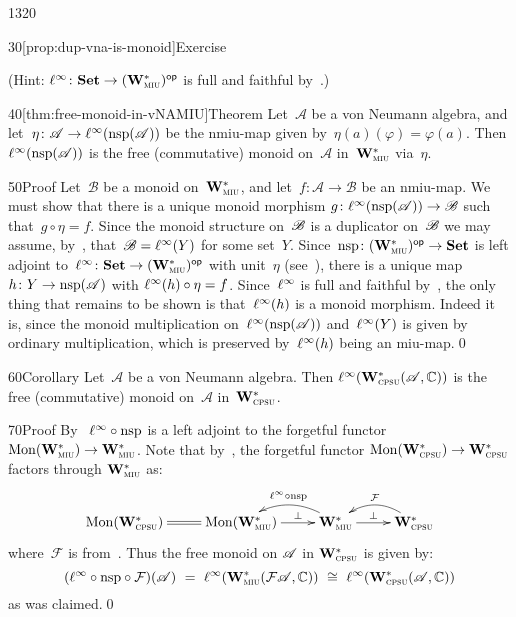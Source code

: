\begin{parsec}{1320}
\begin{point}{30}[prop:dup-vna-is-monoid]{Exercise}
\begin{enumerate}
(Hint: $\ell^\infty\colon \mathbf{Set}\to {(\mathbf{W}^*_{\text{\textsc{miu}}})}{^{\mathsf{op}}}$ is full and faithful
by~.)
\end{enumerate}
\spacingfix%
\end{point}%
\begin{point}{40}[thm:free-monoid-in-vNAMIU]{Theorem}%
Let~$\mathscr{A}$
be a von Neumann algebra,
and let~$\eta\colon \mathscr{A}\to\ell^\infty(\mathrm{nsp}(\mathscr{A}))$
be the nmiu-map
given by~$\eta(a)(\varphi)= \varphi(a)$.
Then $\ell^\infty(\mathrm{nsp}(\mathscr{A}))$
is the free (commutative) monoid
on~$\mathscr{A}$
in~$\mathbf{W}^*_{\text{\textsc{miu}}}$ via~$\eta$.
\begin{point}{50}{Proof}%
Let~$\mathscr{B}$
be a monoid 
on~$\mathbf{W}^*_{\text{\textsc{miu}}}$,
and let~$f\colon \mathscr{A}\to\mathscr{B}$
be an nmiu-map.
We must show that
there is a unique
monoid morphism
$g\colon \ell^\infty(\mathrm{nsp}(\mathscr{A}))
\rightarrow \mathscr{B}$
such that~$g\circ \eta = f$.
Since the monoid structure on~$\mathscr{B}$
is a duplicator on~$\mathscr{B}$
we may assume,
by~,
that~$\mathscr{B}=\ell^\infty(Y)$
for some set~$Y$.
Since~$\mathrm{nsp}\colon {(\mathbf{W}^*_{\text{\textsc{miu}}})}{^{\mathsf{op}}}\to \mathbf{Set}$
is left adjoint
to~$\ell^\infty\colon \mathbf{Set} \to {(\mathbf{W}^*_{\text{\textsc{miu}}})}{^{\mathsf{op}}}$
with unit~$\eta$ (see~),
there is a unique map $h\colon Y\to \mathrm{nsp}(\mathscr{A})$
with $\ell^\infty(h)\circ \eta = f$.
Since~$\ell^\infty$ is full and faithful
by~,
the only thing that remains to be shown is that~$\ell^\infty(h)$
is a monoid morphism.
Indeed it is,
since the monoid multiplication
on~$\ell^\infty(\mathrm{nsp}(\mathscr{A}))$
and~$\ell^\infty(Y)$
is given by ordinary multiplication,
which is preserved by~$\ell^\infty(h)$ being an miu-map.\qed
\end{point}
\end{point}
\begin{point}{60}{Corollary}
Let~$\mathscr{A}$
be a von Neumann algebra.
Then $\ell^\infty(\mathbf{W}^*_{\text{\textsc{cpsu}}}(\mathscr{A},\mathbb{C}))$
is the free (commutative) monoid
on~$\mathscr{A}$ in~$\mathbf{W}^*_{\text{\textsc{cpsu}}}$.%
\begin{point}{70}{Proof}
By~
$\ell^\infty\circ\mathrm{nsp}$ is a left adjoint to
the forgetful functor $\mathrm{Mon}(\mathbf{W}^*_{\text{\textsc{miu}}})\to\mathbf{W}^*_{\text{\textsc{miu}}}$.
Note that
by~,
the forgetful functor $\mathrm{Mon}(\mathbf{W}^*_{\text{\textsc{cpsu}}})\to\mathbf{W}^*_{\text{\textsc{cpsu}}}$
factors through $\mathbf{W}^*_{\text{\textsc{miu}}}$ as:
\[
\xymatrix{
\Mon(\W{cpsu})
\ar@{=}[r]
&
\Mon(\W{miu})
\ar[r]^-{\bot}&
\ar@/_3ex/[l]_{\linf\circ\nsp}
\W{miu}
\ar@{->}[r]^-{\bot}&
\ar@/_3ex/[l]_{\mathcal{F}}
\W{cpsu}
}
\]
where~$\mathcal{F}$ is from~.
Thus the free monoid on $\mathscr{A}$ in $\mathbf{W}^*_{\text{\textsc{cpsu}}}$ is given by:
\[
(\linf\circ\nsp\circ\mathcal{F})(\scrA)
\ =\ 
\linf(\W{miu}(\mathcal{F}\scrA,\C))
\ \cong\ 
\linf(\W{cpsu}(\scrA,\C))
\]
as was claimed.\qed
\end{point}
\end{point}
\end{parsec}
